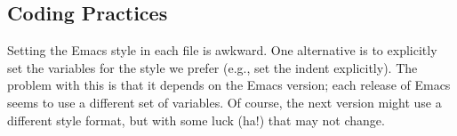 \documentclass{article}
\begin{document}

\subsection{Coding Practices}
Setting the Emacs style in each file is awkward.
One alternative is to explicitly set the variables for the style we prefer
(e.g., set the indent explicitly).  The problem with this is that it depends
on the Emacs version; each release of Emacs seems to use a different set of
variables.  Of course, the next version might use a different style format,
but with some luck (ha!) that may not change.


\end{document}
